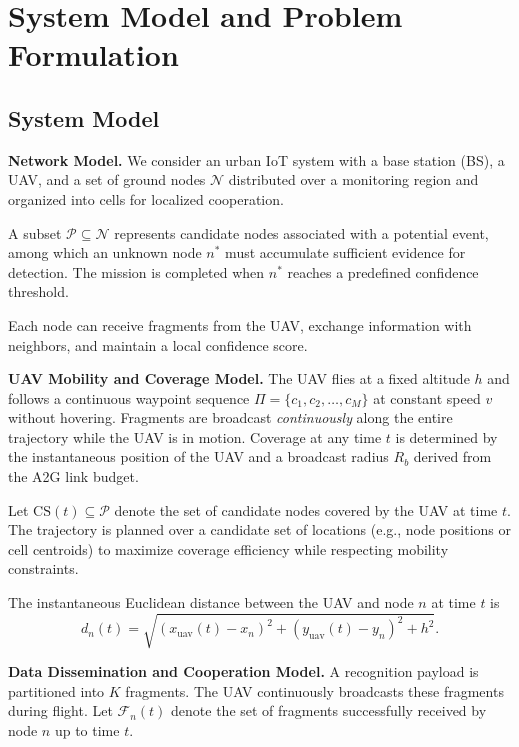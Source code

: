 \documentclass[conference]{IEEEtran}
\begin{document}
\section{System Model and Problem Formulation}
\subsection{System Model}
\noindent\textbf{Network Model.}
We consider an urban IoT system with a base station (BS), a UAV, and a set of ground nodes $\mathcal{N}$ distributed over a monitoring region and organized into cells for localized cooperation.

A subset $\mathcal{P} \subseteq \mathcal{N}$ represents candidate nodes associated with a potential event, among which an unknown node $n^*$ must accumulate sufficient evidence for detection. The mission is completed when $n^*$ reaches a predefined confidence threshold.

Each node can receive fragments from the UAV, exchange information with neighbors, and maintain a local confidence score.

\noindent\textbf{UAV Mobility and Coverage Model.}
The UAV flies at a fixed altitude \(h\) and follows a continuous waypoint sequence \(\Pi = \{c_1, c_2, \dots, c_M\}\) at constant speed \(v\) without hovering. Fragments are broadcast \emph{continuously} along the entire trajectory while the UAV is in motion. Coverage at any time \(t\) is determined by the instantaneous position of the UAV and a broadcast radius \(R_b\) derived from the A2G link budget.

Let \(\mathrm{CS}(t) \subseteq \mathcal{P}\) denote the set of candidate nodes covered by the UAV at time \(t\). The trajectory is planned over a candidate set of locations (e.g., node positions or cell centroids) to maximize coverage efficiency while respecting mobility constraints.

The instantaneous Euclidean distance between the UAV and node \(n\) at time \(t\) is
\begin{equation}
d_n(t) = \sqrt{(x_{\mathrm{uav}}(t) - x_n)^2 + (y_{\mathrm{uav}}(t) - y_n)^2 + h^2}.
\end{equation}

\noindent\textbf{Data Dissemination and Cooperation Model.}
A recognition payload is partitioned into \(K\) fragments. The UAV continuously broadcasts these fragments during flight. Let \(\mathcal{F}_n(t)\) denote the set of fragments successfully received by node \(n\) up to time \(t\).
\end{document}
